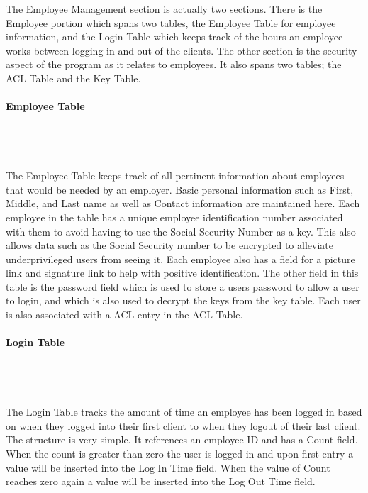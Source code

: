 \documentclass{report}
\begin{document}
    The Employee Management section is actually two sections. There is the Employee portion which
    spans two tables, the Employee Table for employee information, and the Login Table which
    keeps track of the hours an employee works between logging in and out of the clients. The
    other section is the security aspect of the program as it relates to employees. It also spans
    two tables; the ACL Table and the Key Table.\\
    \\
    {\bf Employee Table}\\
    \\
    \\
    \\
    \\
    The Employee Table keeps track of all pertinent information about employees that would
    be needed by an employer. Basic personal information such as First, Middle, and Last name
    as well as Contact information are maintained here. Each employee in the table has a unique
    employee identification number associated with them to avoid having to use the Social
    Security Number as a key. This also allows data such as the Social Security number to be
    encrypted to alleviate underprivileged users from seeing it. Each employee also has a
    field for a picture link and signature link to help with positive identification. The other
    field in this table is the password field which is used to store a users password to allow
    a user to login, and which is also used to decrypt the keys from the key table. Each user
    is also associated with a ACL entry in the ACL Table.\\
    \\
    {\bf Login Table}\\
    \\
    \\
    \\
    \\
    The Login Table tracks the amount of time an employee has been logged in based on when
    they logged into their first client to when they logout of their last client. The structure
    is very simple. It references an employee ID and has a Count field. When the count is greater
    than zero the user is logged in and upon first entry a value will be inserted into the
    Log In Time field. When the value of Count reaches zero again a value will be inserted into
    the Log Out Time field.
\end{document}
